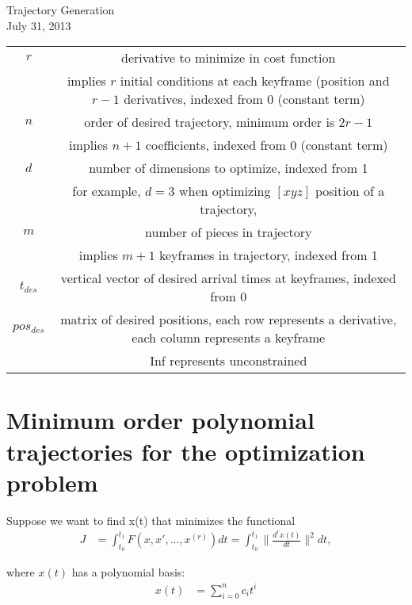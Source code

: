 \documentclass[11pt]{article}
\begin{document}
\centering
Trajectory Generation \\
July 31, 2013

\raggedright

\begin{table} [h!]
\footnotesize
\begin{tabular}{ c c }
	$r$ & derivative to minimize in cost function \\
		& implies $r$ initial conditions at each keyframe (position and $r-1$ derivatives, indexed from 0 (constant term) \\
	$n$ & order of desired trajectory, minimum order is $2r-1$ \\
		&  implies $n+1$ coefficients, indexed from 0 (constant term) \\
	$d$ & number of dimensions to optimize, indexed from 1 \\
	 	& for example, $d=3$ when optimizing $[x y z]$ position of a trajectory,  \\
	$m$ & number of pieces in trajectory \\
		& implies $m+1$ keyframes in trajectory, indexed from 1 \\
	$t_{des}$ & vertical vector of desired arrival times at keyframes, indexed from 0 \\
	$pos_{des}$ & matrix of desired positions, each row represents a derivative, each column represents a keyframe \\
		&  Inf represents unconstrained  \\
\end{tabular}
\label{tab: vars}
\end{table}




\newpage
\small




\section{Minimum order polynomial trajectories for the optimization problem}

Suppose we want to find x(t) that minimizes the functional
\begin{align*}
J &= \int_{t_0}^{t_1} F(x, x', ..., x^{(r)}) dt = \int_{t_0}^{t_1} \|  \frac{d^{r} x(t) }{dt} \|^2 dt,
\end{align*}

where $x(t)$ has a polynomial basis:
\begin{align*}
x(t) &= \sum_{i = 0}^{n} c_i t^i
\end{align*}
\end{document}
